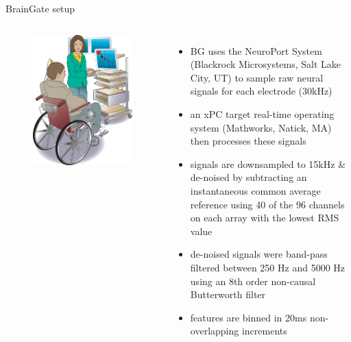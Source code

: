 \documentclass[aspectratio=169,19pt,xetex,handout]{beamer}
\begin{document}
\begin{frame}{BrainGate setup}
\vspace{-25pt}
\begin{columns}
\begin{figure}
\includegraphics[width=\textwidth]{bg_setup_diagram}
\end{figure}
\begin{itemize}
\item BG uses the NeuroPort System (Blackrock Microsystems, Salt Lake City, UT) to sample raw neural signals for each electrode (30kHz) \\
\item an xPC target real-time operating system (Mathworks, Natick, MA) then processes these signals \\
\item signals are downsampled to 15kHz \& de-noised by subtracting an instantaneous common average reference using 40 of the 96 channels on each array with the lowest RMS value
\item de-noised signals were band-pass filtered between 250 Hz and 5000 Hz using an 8th order non-causal Butterworth filter
\item features are binned in 20ms non-overlapping increments
\end{itemize}
\end{columns}

\end{frame}
\end{document}

